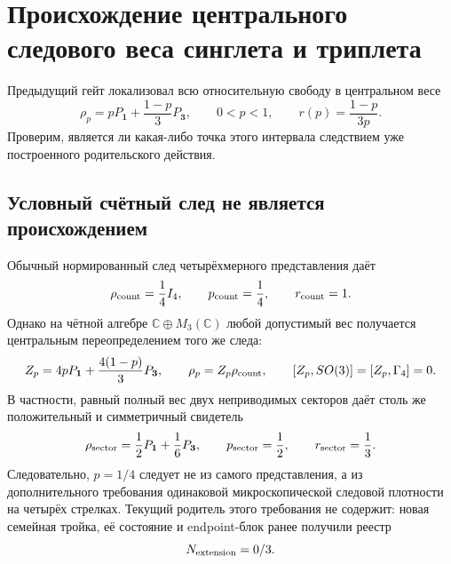 \chapter{Происхождение центрального следового веса синглета и триплета}
\label{ch:v8-baryon-c0-singlet-triplet-central-trace-weight-parent-origin-gate}

Предыдущий гейт локализовал всю относительную свободу в центральном весе
\begin{equation}
 \rho_p=pP_{\mathbf1}+\frac{1-p}{3}P_{\mathbf3},
 \qquad 0<p<1,
 \qquad r(p)=\frac{1-p}{3p}.
 \label{eq:v8-baryon-c0-central-weight-parent-origin-family}
\end{equation}
Проверим, является ли какая-либо точка этого интервала следствием уже
построенного родительского действия.

\section{Условный счётный след не является происхождением}

Обычный нормированный след четырёхмерного представления даёт
\begin{equation}
 \rho_{\rm count}=\frac14I_4,
 \qquad p_{\rm count}=\frac14,
 \qquad r_{\rm count}=1.
 \label{eq:v8-baryon-c0-ambient-counting-trace-candidate}
\end{equation}
Однако на чётной алгебре $\mathbb C\oplus M_3(\mathbb C)$ любой допустимый
вес получается центральным переопределением того же следа:
\begin{equation}
 Z_p=4pP_{\mathbf1}+\frac{4(1-p)}{3}P_{\mathbf3},
 \qquad \rho_p=Z_p\rho_{\rm count},
 \qquad [Z_p,SO(3)]=[Z_p,\Gamma_4]=0.
 \label{eq:v8-baryon-c0-central-density-reweighting}
\end{equation}
В частности, равный полный вес двух неприводимых секторов даёт столь же
положительный и симметричный свидетель
\begin{equation}
 \rho_{\rm sector}=\frac12P_{\mathbf1}+\frac16P_{\mathbf3},
 \qquad p_{\rm sector}=\frac12,
 \qquad r_{\rm sector}=\frac13.
 \label{eq:v8-baryon-c0-central-weight-sector-witness}
\end{equation}
Следовательно, $p=1/4$ следует не из самого представления, а из
дополнительного требования одинаковой микроскопической следовой плотности
на четырёх стрелках. Текущий родитель этого требования не содержит: новая
семейная тройка, её состояние и endpoint-блок ранее получили реестр
\begin{equation}
 N_{\rm extension}=0/3.
 \label{eq:v8-baryon-c0-central-weight-unoriginated-extension-ledger}
\end{equation}

